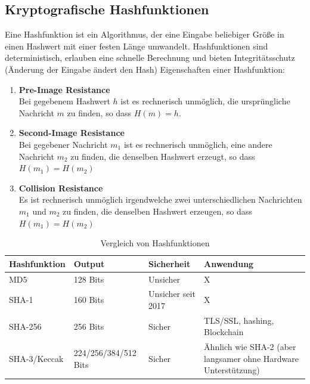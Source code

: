 \documentclass[
../../css_summary.tex,
]
{subfiles}
\begin{document}
\subsection{Kryptografische Hashfunktionen}
Eine Hashfunktion ist ein Algorithmus, der eine Eingabe beliebiger Größe in einen Hashwert mit einer festen Länge umwandelt. Hashfunktionen sind deterministisch, erlauben eine schnelle Berechnung und bieten Integritätsschutz (Änderung der Eingabe ändert den Hash)
Eigenschaften einer Hashfunktion:
\begin{enumerate}
   \item \textbf{Pre-Image Resistance} \\
         Bei gegebenem Hashwert $h$ ist es rechnerisch unmöglich, die ursprüngliche Nachricht $m$ zu finden, so dass $H(m) = h$.
   \item \textbf{Second-Image Resistance}\\
         Bei gegebener Nachricht $m_1$ ist es rechnerisch unmöglich, eine andere Nachricht $m_2$ zu finden, die denselben Hashwert erzeugt, so dass $H(m_1) = H(m_2)$
   \item \textbf{Collision Resistance}\\
         Es ist rechnerisch unmöglich irgendwelche zwei unterschiedlichen Nachrichten $m_1$ und $m_2$ zu finden, die denselben Hashwert erzeugen, so dass $H(m_1) = H(m_2)$
\end{enumerate}
\begin{table}[h!]
   \centering
   \begin{tabular}{|l|l|l|p{5cm}|}
      \hline
      \textbf{Hashfunktion} & \textbf{Output}      & \textbf{Sicherheit} & \textbf{Anwendung}                                             \\ \hline
      MD5                   & 128 Bits             & Unsicher            & X                                                              \\ \hline
      SHA-1                 & 160 Bits             & Unsicher seit 2017  & X                                                              \\ \hline
      SHA-256               & 256 Bits             & Sicher              & TLS/SSL, hashing, Blockchain                                   \\ \hline
      SHA-3/Keccak          & 224/256/384/512 Bits & Sicher              & Ähnlich wie SHA-2 (aber langsamer ohne Hardware Unterstützung) \\ \hline
   \end{tabular}
   \caption{Vergleich von Hashfunktionen}
   \label{tab:hashfunktionen}
\end{table}
\end{document}
